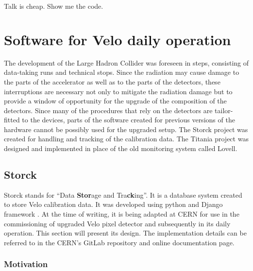 \begin{savequote}[75mm]
Talk is cheap. Show me the code.
\end{savequote}

\chapter{Software for Velo daily operation}
\label{chap:software}

The development of the Large Hadron Collider was foreseen in steps, consisting of data-taking runs and technical stops.
Since the radiation may cause damage to the parts of the accelerator as well as to the parts of the detectors, these interruptions are necessary not only to mitigate the radiation damage but to provide a window of opportunity for the upgrade of the composition of the detectors.
Since many of the procedures that rely on the detectors are tailor-fitted to the devices, parts of the software created for previous versions of the hardware cannot be possibly used for the upgraded setup.
The Storck project was created for handling and tracking of the calibration data. The Titania project was designed and implemented in place of the old monitoring system called Lovell.

\section{Storck}

Storck stands for ``Data \textbf{Stor}age and Tra\textbf{ck}ing''. It is a database system created to store Velo calibration data.
It was developed using python \cite{10.5555/1593511} and Django framework \cite{django}.
At the time of writing, it is being adapted at CERN for use in the commissioning of upgraded Velo pixel detector and subsequently in its daily operation.
This section will present its design.
The implementation details can be referred to in the CERN's GitLab repository \cite{bworld} and online documentation page\cite{storckdock}.

\subsection{Motivation}

